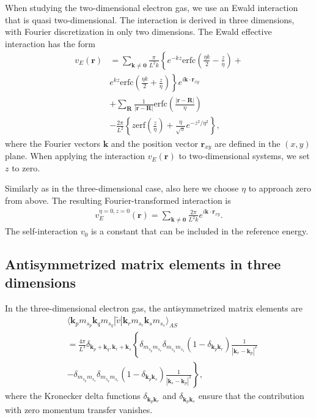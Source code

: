 \documentclass[%
oneside,                 %
final,                   %
10pt]{article}
\begin{document}
When studying the two-dimensional electron gas, we
use an Ewald interaction that is quasi two-dimensional.
The interaction is derived in three dimensions, with 
Fourier discretization in only two dimensions. The Ewald effective
interaction has the form 
\begin{align}
  v_{E}(\mathbf{r}) &= \sum_{\mathbf{k} \neq \mathbf{0}} 
  \frac{\pi }{L^{2}k}\left\{ e^{-kz} \mathrm{erfc} \left(
  \frac{\eta k}{2} - \frac{z}{\eta }\right)+ \right. \nonumber \\
  & \left. e^{kz}\mathrm{erfc} \left( \frac{\eta k}{2} + \frac{z}{\eta }
  \right) \right\} e^{i\mathbf{k}\cdot \mathbf{r}_{xy}} 
  \nonumber \\
  & + \sum_{\mathbf{R}}\frac{1}{\left| \mathbf{r}-\mathbf{R}
    \right| } \mathrm{erfc} \left( \frac{\left| \mathbf{r}-\mathbf{R}
    \right|}{\eta }\right) \nonumber \\
  & - \frac{2\pi}{L^{2}}\left\{ z\mathrm{erf} \left( \frac{z}{\eta }
  \right) + \frac{\eta }{\sqrt{\pi }}e^{-z^{2}/\eta^{2}}\right\},
\end{align}
where the Fourier vectors $\mathbf{k}$ and the position vector
$\mathbf{r}_{xy}$ are defined in the $(x,y)$ plane. When
applying the interaction $v_{E}(\mathbf{r})$ to two-dimensional
systems, we set $z$ to zero. 


Similarly as in the 
three-dimensional case, also here we 
choose $\eta $ to approach zero from above. The resulting 
Fourier-transformed interaction is
\begin{align}
  v_{E}^{\eta = 0, z = 0}(\mathbf{r}) = \sum_{\mathbf{k} \neq \mathbf{0}} 
  \frac{2\pi }{L^{2}k}e^{i\mathbf{k}\cdot \mathbf{r}_{xy}}. 
\end{align}
The self-interaction $v_{0}$ is a constant that can be 
included in the reference energy.




\subsection*{Antisymmetrized matrix elements in three dimensions}

In the three-dimensional electron gas, the antisymmetrized
matrix elements are
\begin{align} \label{eq:vmat_3dheg}
  & \langle \mathbf{k}_{p}m_{s_{p}}\mathbf{k}_{q}m_{s_{q}}
  |\tilde{v}|\mathbf{k}_{r}m_{s_{r}}\mathbf{k}_{s}m_{s_{s}}\rangle_{AS} 
  \nonumber \\
  & = \frac{4\pi }{L^{3}}\delta_{\mathbf{k}_{p}+\mathbf{k}_{q},
    \mathbf{k}_{r}+\mathbf{k}_{s}}\left\{ 
  \delta_{m_{s_{p}}m_{s_{r}}}\delta_{m_{s_{q}}m_{s_{s}}}
  \left( 1 - \delta_{\mathbf{k}_{p}\mathbf{k}_{r}}\right) 
  \frac{1}{|\mathbf{k}_{r}-\mathbf{k}_{p}|^{2}}
  \right. \nonumber \\
  & \left. - \delta_{m_{s_{p}}m_{s_{s}}}\delta_{m_{s_{q}}m_{s_{r}}}
  \left( 1 - \delta_{\mathbf{k}_{p}\mathbf{k}_{s}} \right)
  \frac{1}{|\mathbf{k}_{s}-\mathbf{k}_{p}|^{2}} 
  \right\} ,
\end{align}
where the Kronecker delta functions 
$\delta_{\mathbf{k}_{p}\mathbf{k}_{r}}$ and
$\delta_{\mathbf{k}_{p}\mathbf{k}_{s}}$ ensure that the 
contribution with zero momentum transfer vanishes.
\end{document}
